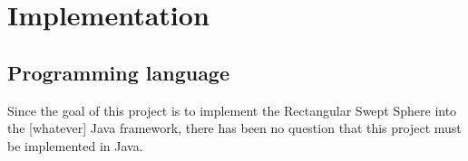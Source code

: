
\section{Implementation}
\label{implementation}

\subsection{Programming language}
Since the goal of this project is to implement the Rectangular Swept Sphere into the [whatever]  Java framework, there has been no question that this project must be implemented in Java.

